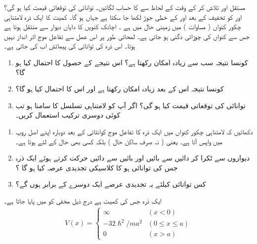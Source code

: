  مستقل    اور  تلاش کر کے   وقت کے لحاظ سے     کا حساب لگائیں۔ توانائی کی توقعاتی قیمت کیا   ہو گی؟     اور   کو تخفیف کے بعد  اور کے خطی جوڑ  لکھا جا سکتا ہے جہاں   ہو گا۔
 کمیت کا ایک ذرہ لامتناہی چکور کنواں ( مساوات )  میں زمینی حال میں ہے ۔ اچانک کنویں کا دایاں دیوار  سے    منتقل ہوتا ہے جس سے کنواں کی چوڑائی دگنی ہو جاتی ہے۔ لمحاتی طور پر اس عمل سے  تفاعل موج اثر انداز نہیں ہوتا۔ اس ذرہ کی توانائی کی پیمائش اب کی جاتی ہے۔
\begin{enumerate}
\item
 کونسا  نتیجہ سب سے زیادہ امکان رکھتا ہے؟ اس نتیجے کے حصول کا احتمال کیا ہو گا؟ 
\item
 کونسا نتیجہ اس کے بعد زیادہ امکان رکھتا ہے اور اس کا احتمال کیا ہو گا؟
\item 
توانائی کی توقعاتی قیمت کیا ہو گی؟   اگر   آپ کو لامتناہی تسلسل کا سامنا ہو تب کوئی دوسری ترکیب استعمال کریں۔
\end{enumerate} 
\begin{enumerate}
\item   
 دکھائیں کہ لامتناہی چکور کنواں میں ایک ذرہ کا  تفاعل موج کوانٹائی    کے بعد دوبارہ اپنے اصل روپ میں واپس آتا ہے۔  یعنی  ( نہ صرف ساکن حال  ) بلکہ کسی بھی حال کے لئے   ہوتا ہے۔ 
\item   
 دیواروں سے ٹکرا کر دائیں سے بائیں اور بائیں سے دائیں حرکت کرتے ہوئے  ایک ذرہ جس کی توانائی   ہو کا کلاسیکی تجدیدی عرصہ کیا ہو گا ؟ 
\item   
 کس توانائی کیلئے یہ  تجدیدی  عرصے  ایک دوسرے کے برابر ہوں گے؟
\end{enumerate} 
  ایک ذرہ جس کی کمیت  ہے  درج ذیل مخفی کو میں پایا جاتا ہے۔ 
\begin{align*}
V(x)=
\begin{cases}
\infty & (x< 0)\\
-32\hslash^{2}/ma^{2} & (0\le x \le a)\\
0 & (x> a)
\end{cases}
\end{align*}

